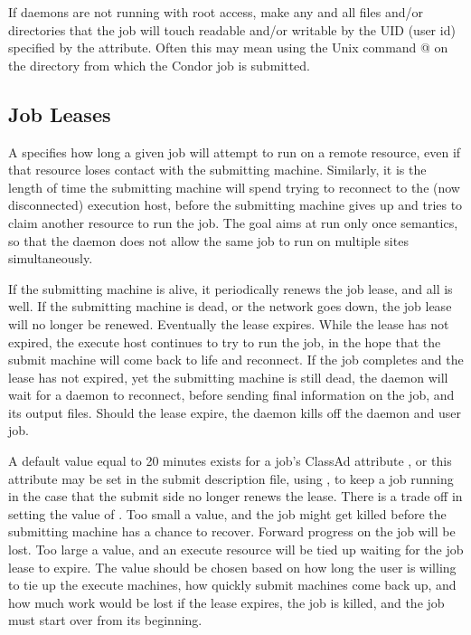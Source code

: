 If daemons are not running with root access, 
make any and all files
and/or directories that the job will touch readable and/or writable by
the UID (user id) specified by the  attribute.
Often this may
mean using the Unix command @
on the directory from which the Condor job is submitted.

\subsection{\label{sec:Job-Lease}
Job Leases}

A  specifies how long a given job will attempt to run
on a remote resource,
even if that resource loses contact with the submitting machine.
Similarly, it is the length of time the submitting machine will
spend trying to reconnect to the (now disconnected) execution host,
before the submitting machine gives up and tries to claim
another resource to run the job.
The goal aims at run only once semantics,
so that the  daemon does not allow the same job
to run on multiple sites simultaneously.

If the submitting machine is alive,
it periodically renews the job lease,
and all is well.
If the submitting machine is dead,
or the network goes down, the job lease will no longer be renewed.
Eventually the lease expires.
While the lease has not expired,
the execute host continues to try to run the job,
in the hope that the submit machine will come back to life
and reconnect.
If the job completes and the lease has not expired, yet the 
submitting machine is still dead,
the  daemon will wait for a
 daemon to reconnect, 
before sending final information on the job,
and its output files.
Should the lease expire, the  daemon
kills off the  daemon and user job.

A default value equal to 20 minutes exists for a job's
ClassAd attribute , 
or this attribute may be set in the submit description file,
using ,
to keep a job running in the case that the submit side no longer
renews the lease.
There is a trade off in setting the value of . 
Too small a value,
and the job might get killed before the submitting machine has a
chance to recover.
Forward progress on the job will be lost.
Too large a value,
and an execute resource will be tied up waiting for the job lease to expire.
The value should be chosen based on how long the user is willing to tie up
the execute machines, how quickly submit machines come  back up,
and how much work would be lost if the lease expires,
the job is killed, and the job must start over from its beginning.

